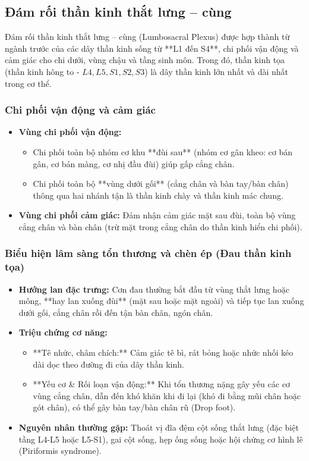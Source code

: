 \subsection{Đám rối thần kinh thắt lưng -- cùng}

Đám rối thần kinh thắt lưng -- cùng (Lumbosacral Plexus) được hợp thành từ ngành trước của các dây thần kinh sống từ **L1 đến S4**, chi phối vận động và cảm giác cho chi dưới, vùng chậu và tầng sinh môn. Trong đó, thần kinh tọa (thần kinh hông to - $L4, L5, S1, S2, S3$) là dây thần kinh lớn nhất và dài nhất trong cơ thể.

\subsubsection{Chi phối vận động và cảm giác}
\begin{itemize}
    \item \textbf{Vùng chi phối vận động:}
    \begin{itemize}
        \item Chi phối toàn bộ nhóm cơ khu **đùi sau** (nhóm cơ gân kheo: cơ bán gân, cơ bán màng, cơ nhị đầu đùi) giúp gấp cẳng chân.
        \item Chi phối toàn bộ **vùng dưới gối** (cẳng chân và bàn tay/bàn chân) thông qua hai nhánh tận là thần kinh chày và thần kinh mác chung.
    \end{itemize}

    \item \textbf{Vùng chi phối cảm giác:} Đảm nhận cảm giác mặt sau đùi, toàn bộ vùng cẳng chân và bàn chân (trừ mặt trong cẳng chân do thần kinh hiển chi phối).
\end{itemize}

\subsubsection{Biểu hiện lâm sàng tổn thương và chèn ép (Đau thần kinh tọa)}
\begin{itemize}
    \item \textbf{Hướng lan đặc trưng:} Cơn đau thường bắt đầu từ vùng thắt lưng hoặc mông, **hay lan xuống đùi** (mặt sau hoặc mặt ngoài) và tiếp tục lan xuống dưới gối, cẳng chân rồi đến tận bàn chân, ngón chân.
    \item \textbf{Triệu chứng cơ năng:}
    \begin{itemize}
        \item **Tê nhức, châm chích:** Cảm giác tê bì, rát bỏng hoặc nhức nhối kéo dài dọc theo đường đi của dây thần kinh.
        \item **Yếu cơ \& Rối loạn vận động:** Khi tổn thương nặng gây yếu các cơ vùng cẳng chân, dẫn đến khó khăn khi đi lại (khó đi bằng mũi chân hoặc gót chân), có thể gây bàn tay/bàn chân rũ (Drop foot).
    \end{itemize}
    \item \textbf{Nguyên nhân thường gặp:} Thoát vị đĩa đệm cột sống thắt lưng (đặc biệt tầng L4-L5 hoặc L5-S1), gai cột sống, hẹp ống sống hoặc hội chứng cơ hình lê (Piriformis syndrome).
\end{itemize}

